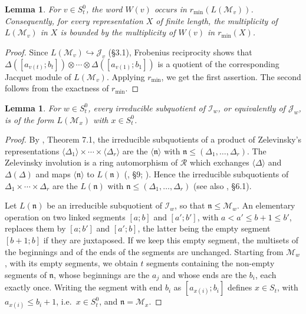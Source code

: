 \documentclass[a4paper,12pt,leqno]{amsart}
\newcommand{\frn}{\mathfrak{n}}
\newcommand{\caI}{\mathcal{I}}
\newcommand{\caJ}{\mathcal{J}}
\newcommand{\caM}{\mathcal{M}}
\newcommand{\caR}{\mathcal{R}}
\theoremstyle{plain}
\newtheorem{lemma}[thm]{Lemma}
\theoremstyle{definition}
\theoremstyle{definition}
\begin{document}
\begin{lemma}\label{lem:costword} For $v\in S_t^0$, the word $W(v)$ occurs in
$r_{\min}(L(\caM_v))$. Consequently, for every representation $X$ of finite length, the
multiplicity of $L(\caM_v)$ in $X$ is bounded by the multiplicity of $W(v)$ in $r_{\min}(X)$.
\end{lemma}

\begin{proof}
Since $L(\caM_v)\hookrightarrow\caJ_v$ (\S 3.1), Frobenius reciprocity shows that
$\Delta([a_{v(t)};b_t])\otimes\cdots\otimes\Delta([a_{v(1)};b_1])$ is a quotient of the
corresponding Jacquet module of $L(\caM_v)$. Applying $r_{\min}$, we get the first assertion. The
second follows from the exactness of $r_{\min}$.
\end{proof}


\begin{lemma}\label{lem:constituents} For $w\in S_t^0$, every irreducible subquotient of $\caI_w$,
or equivalently of $\caJ_w$, is of the form $L(\caM_x)$ with $x\in S_t^0$.
\end{lemma}

\begin{proof}
By \cite{Zel80}, Theorem 7.1, the irreducible subquotients of a product of Zelevinsky's
representations $\langle\Delta_1\rangle\times\cdots\times\langle\Delta_r\rangle$ are the $\langle\frn\rangle$ with
$\frn\leq(\Delta_1,\ldots,\Delta_r)$. The Zelevinsky involution is a ring automorphism of $\caR$ which
exchanges $\langle\Delta\rangle$ and $\Delta(\Delta)$ and maps $\langle\frn\rangle$ to $L(\frn)$ (\cite{Zel80}, \S9;
\cite{MW86}). Hence the irreducible subquotients of $\Delta_1\times\cdots\times\Delta_r$ are the $L(\frn)$
with $\frn\leq(\Delta_1,\ldots,\Delta_r)$ (see also \cite{LM13}, \S6.1).

Let $L(\frn)$ be an irreducible subquotient of $\caI_w$, so that $\frn\leq\caM_w$. An elementary operation
on two linked segments $[a;b]$ and $[a';b']$, with $a<a'\leq b+1\leq b'$, replaces them by $[a;b']$ and
$[a';b]$, the latter being the empty segment $[b+1;b]$ if they are juxtaposed. If we keep this empty
segment, the multisets of the beginnings and of the ends of the segments are unchanged. Starting from
$\caM_w$, with its empty segments, we obtain $t$ segments containing the non-empty segments of $\frn$,
whose beginnings are the $a_j$ and whose ends are the $b_i$, each exactly once. Writing the segment
with end $b_i$ as $[a_{x(i)};b_i]$ defines $x\in S_t$, with $a_{x(i)}\leq b_i+1$, i.e.\ $x\in S_t^0$, and
$\frn=\caM_x$.
\end{proof}
\end{document}
